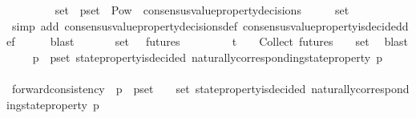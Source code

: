 \begin{isabellebody}
\ \ \ \ \isamarkupfalse%
\ \ {\isacartoucheopen}{\isasymsigma}\ {\isasymin}\ {\isasymsigma}{\isacharunderscore}set\ {\isasymand}\ p{\isacharunderscore}set\ {\isasymin}\ Pow\ {\isacharparenleft}{\isasymUnion}\ {\isacharbraceleft}consensus{\isacharunderscore}value{\isacharunderscore}property{\isacharunderscore}decisions\ {\isasymsigma}{\isacharprime}\ {\isacharbar}\ {\isasymsigma}{\isacharprime}{\isachardot}\ {\isasymsigma}{\isacharprime}\ {\isasymin}\ {\isasymsigma}{\isacharunderscore}set{\isacharbraceright}{\isacharparenright}\ {\isacharminus}\ {\isacharbraceleft}{\isasymemptyset}{\isacharbraceright}{\isacartoucheclose}\isanewline
\ \ \ \ \isamarkupfalse%
\ {\isacharparenleft}simp\ add{\isacharcolon}\ consensus{\isacharunderscore}value{\isacharunderscore}property{\isacharunderscore}decisions{\isacharunderscore}def\ consensus{\isacharunderscore}value{\isacharunderscore}property{\isacharunderscore}is{\isacharunderscore}decided{\isacharunderscore}def{\isacharparenright}\isanewline
\ \ \ \ \isamarkupfalse%
\ blast\isanewline
\ \ \isamarkupfalse%
\ {\isachardoublequoteopen}{\isasymforall}\ {\isasymsigma}{\isacharprime}{\isacharprime}\ {\isasymin}\ {\isasymsigma}{\isacharunderscore}set{\isachardot}\ {\isasymsigma}{\isacharprime}\ {\isasymin}\ futures\ {\isasymsigma}{\isacharprime}{\isacharprime}{\isachardoublequoteclose}\isanewline
\ \ \ \ \isamarkupfalse%
\ {\isacartoucheopen}{\isasymsigma}{\isacharprime}\ {\isasymin}\ {\isasymSigma}t\ {\isasymand}\ {\isasymsigma}{\isacharprime}\ {\isasymin}\ {\isasymInter}{\isacharunderscore}Collect\ {\isacharparenleft}futures\ {\isasymsigma}{\isacharparenright}\ {\isacharparenleft}{\isasymsigma}\ {\isasymin}\ {\isasymsigma}{\isacharunderscore}set{\isacharparenright}{\isacartoucheclose}\ \isamarkupfalse%
\ blast\isanewline
\ \ \isamarkupfalse%
\ {\isachardoublequoteopen}{\isasymforall}\ p\ {\isasymin}\ p{\isacharunderscore}set{\isachardot}\ state{\isacharunderscore}property{\isacharunderscore}is{\isacharunderscore}decided\ {\isacharparenleft}naturally{\isacharunderscore}corresponding{\isacharunderscore}state{\isacharunderscore}property\ p{\isacharcomma}\ {\isasymsigma}{\isacharprime}{\isacharparenright}{\isachardoublequoteclose}\isanewline
\ \ \ \ \isamarkupfalse%
\ forward{\isacharunderscore}consistency\ {\isacartoucheopen}{\isasymforall}\ p\ {\isasymin}\ p{\isacharunderscore}set{\isachardot}\ {\isasymexists}\ {\isasymsigma}{\isacharprime}{\isacharprime}\ {\isasymin}\ {\isasymsigma}{\isacharunderscore}set{\isachardot}\ state{\isacharunderscore}property{\isacharunderscore}is{\isacharunderscore}decided\ {\isacharparenleft}naturally{\isacharunderscore}corresponding{\isacharunderscore}state{\isacharunderscore}property\ p{\isacharcomma}\ {\isasymsigma}{\isacharprime}{\isacharprime}{\isacharparenright}{\isacartoucheclose}\ \isanewline

\end{isabellebody}
